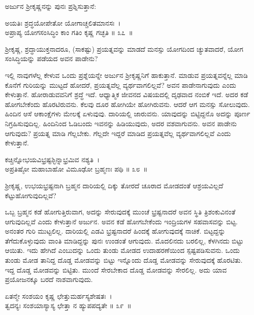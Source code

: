 ಅರ್ಜುನ ಶ‍್ರೀಕೃಷ್ಣನನ್ನು ಪುನಃ ಪ್ರಶ್ನಿಸುತ್ತಾನೆ:

\begin{shloka}
ಅಯತಿಃ ಶ್ರದ್ಧಯೋಪೇತೋ ಯೋಗಾಚ್ಚಲಿತಮಾನಸಃ~।\\ಅಪ್ರಾಪ್ಯ ಯೋಗಸಂಸಿದ್ಧಿಂ ಕಾಂ ಗತಿಂ ಕೃಷ್ಣ ಗಚ್ಛತಿ \hfill॥ ೩೭~॥
\end{shloka}

\begin{artha}
ಶ‍್ರೀಕೃಷ್ಣ, ಶ್ರದ್ಧಾಯುಕ್ತನಾದರೂ, (ಸಾಕಷ್ಟು) ಪ್ರಯತ್ನವನ್ನು ಮಾಡದೆ ಮನಸ್ಸು ಯೋಗದಿಂದ ಚ್ಯುತವಾದರೆ, ಯೋಗ ಸಂಸಿದ್ಧಿಯನ್ನು ಪಡೆಯದ ಅವನ ಪಾಡೇನು?
\end{artha}

ಇಲ್ಲಿ ನಾವುಗಳೆಲ್ಲ ಕೇಳುವ ಒಂದು ಪ್ರಶ್ನೆಯನ್ನೇ ಅರ್ಜುನ ಶ‍್ರೀಕೃಷ್ಣನಿಗೆ ಹಾಕುತ್ತಾನೆ. ಮಾಡುವ ಪ್ರಯತ್ನವನ್ನೆಲ್ಲ ಮಾಡಿ ಕೊನೆಗೆ ಗುರಿಯನ್ನು ಮುಟ್ಟದೆ ಹೋದರೆ, ಪ್ರಯತ್ನವೆಲ್ಲ ವ್ಯರ್ಥವಾಗಲಿಲ್ಲವೆ? ಅವನ ಪಾಡೇನಾಗುವುದು ಎಂದು ಕೇಳುತ್ತಾನೆ. ಹೋರಾಡುವವನಿಗೆ ಶ್ರದ್ಧೆ ಇದೆ. ಆಧ್ಯಾತ್ಮಿಕ ಜೀವನದ ವಿಷಯದಲ್ಲಿ ದೃಢವಾದ ನಂಬಿಕೆ ಇದೆ. ಅದರ ಕಡೆ ಹೋಗಬೇಕೆಂದು ಹೊರಟಿರುವನು. ಕೆಲವು ದೂರ ಹೋಗಿಯೇ ಹೋಗಿರುವನು. ಆದರೆ ಆಗ ಮನಸ್ಸು ಸೋಲುವುದು. ಹಿಂದಿನ ಆಸೆ ಆಕಾಂಕ್ಷೆಗಳು ಮೇಲಕ್ಕೆ ಏಳುವುವು. ದಾರಿಯಲ್ಲಿ ಜಾರುವನು. ಯಾವುದನ್ನು ಬಿಟ್ಟಿದ್ದನೊ ಅದನ್ನು ಪೂರ್ಣ ನಿಗ್ರಹಿಸುವುದಿಲ್ಲ. ಹಿಂದಿನಿಂದ ಓಡಿಬಂದು ಇವನನ್ನು ಹಿಡಿಯುವುದು, ಅದರ ವಶವಾಗುವನು. ಅವನ ಪಾಡೇನು ಆಗುವುದು? ಪ್ರಯತ್ನ ಮಾಡಿ ಗೆಲ್ಲಬೇಕು. ಗೆಲ್ಲದೇ ಇದ್ದರೆ ಮಾಡಿದ ಪ್ರಯತ್ನವೆಲ್ಲ ವ್ಯರ್ಥವಾಗಲಿಲ್ಲವೆ ಎಂದು ಕೇಳುತ್ತಾನೆ.

\begin{shloka}
ಕಚ್ಚಿನ್ನೋಭಯವಿಭ್ರಷ್ಟಶ್ಛಿನ್ನಾಭ್ರಮಿವ ನಶ್ಯತಿ~।\\ಅಪ್ರತಿಷ್ಠೋ ಮಹಾಬಾಹೋ ವಿಮೂಢೋ ಬ್ರಹ್ಮಣಃ ಪಥಿ \hfill॥ ೩೮~॥
\end{shloka}

\begin{artha}
ಶ‍್ರೀಕೃಷ್ಣ, ಉಭಯಭ್ರಷ್ಟನಾಗಿ ಬ್ರಹ್ಮನ ದಾರಿಯಲ್ಲಿ ದಿಕ್ಕು ತೋರದೆ ಚೂರಾದ ಮೋಡದಂತೆ ಆಶ್ರಯವಿಲ್ಲದೆ ಕೆಟ್ಟುಹೋಗುವುದಿಲ್ಲವೆ?
\end{artha}

ಒಬ್ಬ ಬ್ರಹ್ಮನ ಕಡೆ ಹೋಗುತ್ತಿರುವಾಗ, ಅದನ್ನು ಸೇರುವುದಕ್ಕೆ ಮುಂಚೆ ಭ್ರಷ್ಟನಾದರೆ ಅವನ ಸ್ಥಿತಿ ತ್ರಿಶಂಕುವಿನಂತೆ ಆಗುವುದಿಲ್ಲವೆ ಎಂದು ಕೇಳುತ್ತಾನೆ ಅರ್ಜುನ. ಅವನ ಕಡೆ ಹೋಗಬೇಕೆಂದು ಇಂದ್ರಿಯಗಳ ಸಹವಾಸವನ್ನು ಬಿಟ್ಟ. ಅನಂತರ ಗುರಿ ಮುಟ್ಟಲಿಲ್ಲ. ದಾರಿಯಲ್ಲಿ ಎಡವಿ ಭ್ರಷ್ಟನಾದರೆ ಹಿಂದಕ್ಕೆ ಹೋಗುವುದಕ್ಕೆ ನಾಚಿಕೆ. ಬಿಟ್ಟದ್ದನ್ನು ತೆಗೆದುಕೊಳ್ಳುವುದು ವಾಂತಿ ಮಾಡಿದ್ದನ್ನು ಪುನಃ ಉಂಡಂತೆ ಆಗುವುದು. ಮೊದಲಿನದು ಬರಲಿಲ್ಲ, ಕೆಳಗಿನದು ಬಿಟ್ಟು ಆಯಿತು. ಇದು ಹೇಗಿದೆ ಎಂಬುದನ್ನು ಒಂದು ತುಂಡು ಮೋಡದ ಉದಾಹರಣೆಯಿಂದ ಸ್ಪಷ್ಟಪಡಿಸುವನು. ಒಂದು ತುಂಡು ಮೋಡ ತಾನಿದ್ದ ದೊಡ್ಡ ಮೋಡವನ್ನು ಬಿಟ್ಟು ಇನ್ನೊಂದು ದೊಡ್ಡ ಮೋಡವನ್ನು ಸೇರುವುದಕ್ಕೆ ಹೊರಟಿತು. ಇದ್ದ ದೊಡ್ಡ ಮೋಡವನ್ನು ಬಿಟ್ಟಿತು. ಮುಂದೆ ಸೇರಬೇಕಾದ ದೊಡ್ಡ ಮೋಡವನ್ನು ಸೇರಲಿಲ್ಲ. ಅದು ಯಾವ ಪ್ರಯೋಜನಕ್ಕೂ ಬರದೆ ನಾಶವಾಗುವುದು.

\begin{shloka}
ಏತನ್ಮೇ ಸಂಶಯಂ ಕೃಷ್ಣ ಛೇತ್ತುಮರ್ಹಸ್ಯಶೇಷತಃ~।\\ತ್ವದನ್ಯಃ ಸಂಶಯಾಸ್ಯಾಸ್ಯ ಛೇತ್ತಾ ನ ಹ್ಯುಪಪದ್ಯತೇ \hfill॥ ೩೯~॥
\end{shloka}

